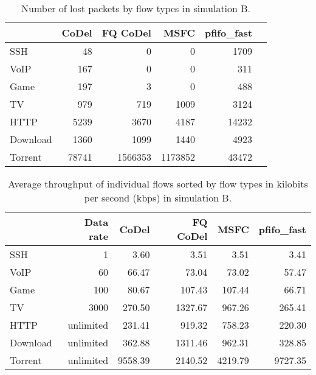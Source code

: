 \begin{table}
	\caption{Number of lost packets by flow types in simulation B.}
	\label{tab:loss_B}
	\centering
	
	\begin{tabular}{@{}l|rrrrr@{}}
		\toprule
		& {CoDel} & {FQ CoDel} & {MSFC} & {pfifo\_fast}  \\ \midrule
		SSH       &    48         &    0          &    0          &    1709  \\
		VoIP      &    167        &    0          &    0          &    311   \\
		Game      &    197        &    3          &    0          &    488   \\
		TV        &    979        &    719        &    1009       &    3124  \\
		HTTP      &    5239       &    3670       &    4187       &    14232 \\
		Download  &    1360       &    1099       &    1440       &    4923  \\
		Torrent   &    78741      &    1566353    &    1173852    &    43472 \\ \bottomrule
	\end{tabular}
\end{table}

\begin{table}
	\caption{Average throughput of individual flows sorted by flow types in kilobits per second (kbps) in simulation B.}
	\label{tab:throughput_B}
	\centering
	
	\begin{tabular}{@{}l|rrrrr@{}}
		\toprule
		         & {Data rate} & {CoDel} & {FQ CoDel} &  {MSFC} & {pfifo\_fast} \\ \midrule
		SSH      &           1 &    3.60 &       3.51 &    3.51 &          3.41 \\
		VoIP     &          60 &   66.47 &      73.04 &   73.02 &         57.47 \\
		Game     &         100 &   80.67 &     107.43 &  107.44 &         66.71 \\
		TV       &        3000 &  270.50 &    1327.67 &  967.26 &        265.41 \\
		HTTP     &   unlimited &  231.41 &     919.32 &  758.23 &        220.30 \\
		Download &   unlimited &  362.88 &    1311.46 &  962.31 &        328.85 \\
		Torrent  &   unlimited & 9558.39 &    2140.52 & 4219.79 &       9727.35 \\ \bottomrule
	\end{tabular}
\end{table}









